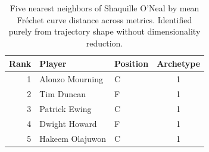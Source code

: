 \begin{table}[htbp]
  \centering\small
  \begin{tabular}{rllc}
    \toprule
    Rank & Player & Position & Archetype \\
    \midrule
    1 & Alonzo Mourning & C & 1 \\
    2 & Tim Duncan & F & 1 \\
    3 & Patrick Ewing & C & 1 \\
    4 & Dwight Howard & F & 1 \\
    5 & Hakeem Olajuwon & C & 1 \\
    \bottomrule
  \end{tabular}
  \caption{Five nearest neighbors of Shaquille O'Neal by mean Fr\'{e}chet curve distance across metrics. Identified purely from trajectory shape without dimensionality reduction.}
  \label{tab:Shaquille_O_Neal_frechet_curve_neighbors}
\end{table}


